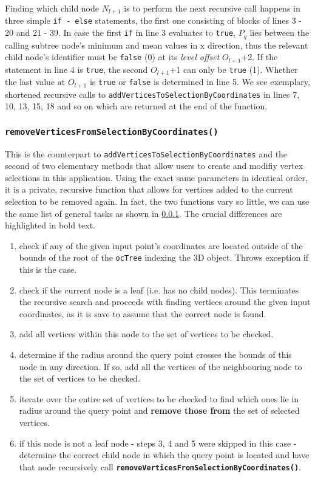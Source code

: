 Finding which child node $N_{l+1}$ is to perform the next recursive call happens in three simple \texttt{if - else} statements, the first one consisting of blocks of lines 3 - 20 and 21 - 39. In case the first \texttt{if} in line 3 evaluates to \texttt{true}, $P_q$ lies between the calling subtree node's minimum and mean values in x direction, thus the relevant child node's identifier must be \texttt{false} (0) at its \textit{level offset} $O_{l+1}$+2. If the statement in line 4 is \texttt{true}, the second $O_{l+1}$+1 can only be \texttt{true} (1). Whether the last value at $O_{l+1}$ is \texttt{true} or \texttt{false} is determined in line 5. We see exemplary, shortened recursive calls to \texttt{addVerticesToSelectionByCoordinates} in lines 7, 10, 13, 15, 18 and so on which are returned at the end of the function.

	\subsubsection{\texttt{removeVerticesFromSelectionByCoordinates()}}
	\label{sec:removeVerticesFromSelectionByCoordinates()}

This is the counterpart to \texttt{addVerticesToSelectionByCoordinates} and the second of two elementary methods that allow users to create and modifiy vertex selections in this application. Using the exact same parameters in identical order, it is a private, recursive function that allows for vertices added to the current selection to be removed again. In fact, the two functions vary so little, we can use the same list of general tasks as shown in \ref{sec:removeVerticesFromSelectionByCoordinates()}. The crucial differences are highlighted in bold text.

\begin{enumerate}
	\item check if any of the given input point's coordinates are located outside of the bounds of the root of the \texttt{ocTree} indexing the 3D object. Throws exception if this is the case.
	\item check if the current node is a leaf (i.e. has no child nodes). This terminates the recursive search and proceeds with finding vertices around the given input coordinates, as it is save to assume that the correct node is found.
	\item add all vertices within this node to the set of vertices to be checked.
	\item determine if the radius around the query point crosses the bounds of this node in any direction. If so, add all the vertices of the neighbouring node to the set of vertices to be checked.
	\item iterate over the entire set of vertices to be checked to find which ones lie in radius around the query point and \textbf{remove those from} the set of selected vertices.
	\item if this node is not a leaf node - steps 3, 4 and 5 were skipped in this case - determine the correct child node in which the query point is located and have that node recursively call \textbf{\texttt{removeVerticesFromSelectionByCoordinates()}}.
\end{enumerate}

